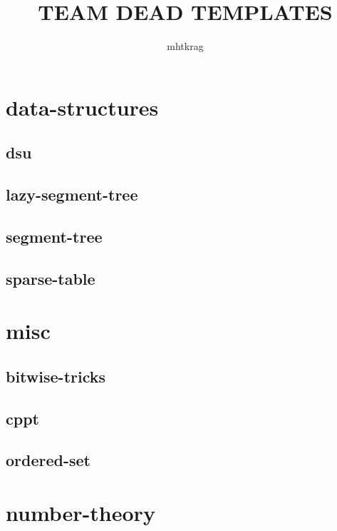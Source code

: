 \documentclass[a4paper, twocolumn]{article}
\title{TEAM DEAD TEMPLATES}
\author{mhtkrag}
\begin{document}
\begin{titlepage}
\maketitle
\thispagestyle{empty}
\pagebreak
\pagestyle{fancy}
\lhead{}
\rhead{}
\cfoot{}
\tableofcontents
\end{titlepage}

\pagestyle{fancy}
\cfoot{- \thepage \ -}
  
\section{data-structures}
\subsection{dsu}

\subsection{lazy-segment-tree}

\subsection{segment-tree}

\subsection{sparse-table}

\section{misc}
\subsection{bitwise-tricks}

\subsection{cppt}

\subsection{ordered-set}

\section{number-theory}
\end{document}
